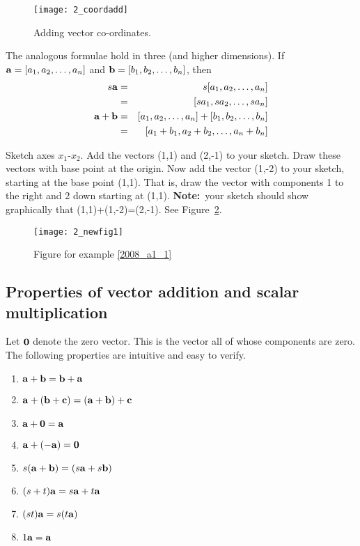 \begin{figure}
\centerline{\texttt{[image: 2\_coordadd]}}
\caption{Adding vector co-ordinates. \label{fig_coordadd}}
\end{figure}

The analogous formulae hold in three (and higher dimensions). If 
$\aa=[a_1,a_2,\ldots,a_n]$ and $\bb = [b_1,b_2,\ldots,b_n]$, then
\begin{eqnarray*}
s\aa &=& s[a_1,a_2,\ldots,a_n]\\
&=&[sa_1,sa_2,\ldots,sa_n]\\
\aa+\bb&=&[a_1,a_2,\ldots,a_n]+[b_1,b_2,\ldots,b_n]\\
&=&[a_1+b_1,a_2+b_2,\ldots,a_n+b_n]
\end{eqnarray*}

\begin{example}
\label{2008_a1_1}
Sketch axes $x_1$-$x_2$. Add the vectors (1,1) and (2,-1) to
your sketch. Draw these vectors with base point at the origin. Now add
the vector (1,-2) to your sketch, starting at the base point
(1,1). That is, draw the vector with components 1 to the right and 2
down starting at (1,1). {\bf Note:}\ your sketch should show
graphically that (1,1)+(1,-2)=(2,-1). {\rm See Figure~\ref{ch2exnew2}.}
\end{example}

\begin{figure}[htb]
\centerline{\texttt{[image: 2\_newfig1]}}
\caption{Figure for example \ref{2008_a1_1} \label{ch2exnew2}}
\end{figure}

\subsection{Properties of vector addition and scalar multiplication}

Let $\zv$ denote the zero vector. This is the vector all of whose
components are zero. The following properties are intuitive and easy
to verify.

\begin{enumerate}
\item $\aa+\bb=\bb+\aa$	
\item $\aa+(\bb+\cc)=(\aa+\bb)+\cc$
\item $\aa+\zv=\aa$
\item $\aa+(-\aa)= \zv$
\item $s(\aa+\bb)=(s\aa+s\bb)$
\item $(s+t)\aa=s\aa+t\aa$
\item $(st)\aa=s(t\aa)$	
\item $1\aa=\aa$
\end{enumerate}

